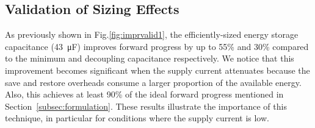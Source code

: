 



\subsection{Validation of Sizing Effects}

As previously shown in Fig.\ref{fig:imprvalid1}, the efficiently-sized energy storage capacitance (\SI{43}{\micro\farad}) improves forward progress by up to 55\% and 30\% compared to the minimum and decoupling capacitance respectively. We notice that this improvement becomes significant when the supply current attenuates because the save and restore overheads consume a larger proportion of the available energy. Also, this achieves at least 90\% of the ideal forward progress mentioned in Section~\ref{subsec:formulation}. 
These results illustrate the importance of this technique, in particular for conditions where the supply current is low.